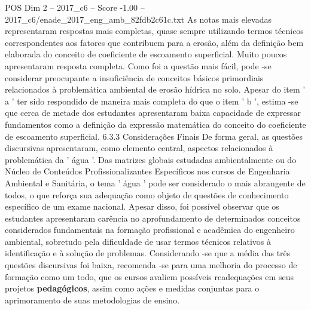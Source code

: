\begin{textsample}{POS Dim 2 – 2017\_c6 – Score -1.00 – 2017\_c6/enade\_2017\_eng\_amb\_82fdb2c61c.txt}
As notas mais elevadas representaram respostas mais completas, quase sempre utilizando termos técnicos correspondentes aos fatores que contribuem para a erosão, além da definição bem elaborada do conceito de coeficiente de escoamento superficial.
Muito poucos apresentaram resposta completa.
Como foi a questão mais fácil, pode -se considerar preocupante a insuficiência de conceitos básicos primordiais relacionados à problemática ambiental de erosão hídrica no solo.
Apesar do item ' a ' ter sido respondido de maneira mais completa do que o item ' b ', estima -se que cerca de metade dos estudantes apresentaram baixa capacidade de expressar fundamentos como a definição da expressão matemática do conceito do coeficiente de escoamento superficial. 6.3.3 Considerações Finais De forma geral, as questões discursivas apresentaram, como elemento central, aspectos relacionados à problemática da ' água '.
Das matrizes globais estudadas ambientalmente ou do Núcleo de Conteúdos Profissionalizantes Específicos nos cursos de Engenharia Ambiental e Sanitária, o tema ' água ' pode ser considerado o mais abrangente de todos, o que reforça sua adequação como objeto de questões de conhecimento específico de um exame nacional.
Apesar disso, foi possível observar que os estudantes apresentaram carência no aprofundamento de determinados conceitos considerados fundamentais na formação profissional e acadêmica do engenheiro ambiental, sobretudo pela dificuldade de usar termos técnicos relativos à identificação e à solução de problemas.
Considerando -se que a média das três questões discursivas foi baixa, recomenda -se para uma melhoria do processo de formação como um todo, que os cursos avaliem possíveis readequações em seus projetos \textbf{pedagógicos}, assim como ações e medidas conjuntas para o aprimoramento de suas metodologias de ensino.

\end{textsample}
